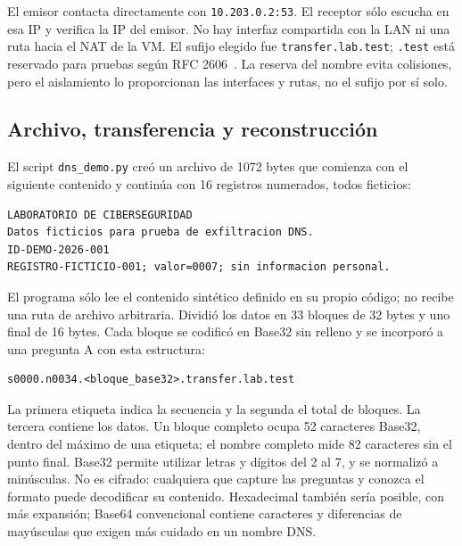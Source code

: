 \documentclass[11pt,a4paper]{article}
\begin{document}
El emisor contacta directamente con \nolinkurl{10.203.0.2:53}. El receptor sólo
escucha en esa IP y verifica la IP del emisor. No hay interfaz compartida
con la LAN ni una ruta hacia el NAT de la VM. El sufijo elegido fue
\nolinkurl{transfer.lab.test}; \nolinkurl{.test} está reservado para pruebas
según RFC 2606~\cite{rfc2606}. La reserva del nombre evita colisiones, pero
el aislamiento lo proporcionan las interfaces y rutas, no el sufijo por sí solo.

\subsection{Archivo, transferencia y reconstrucción}

El script \nolinkurl{dns_demo.py} creó un archivo de 1072 bytes que comienza
con el siguiente contenido y continúa con 16 registros numerados, todos ficticios:

\par\noindent\begin{minipage}{\linewidth}
\begin{lstlisting}
LABORATORIO DE CIBERSEGURIDAD
Datos ficticios para prueba de exfiltracion DNS.
ID-DEMO-2026-001
REGISTRO-FICTICIO-001; valor=0007; sin informacion personal.
\end{lstlisting}
\end{minipage}\par\medskip

El programa sólo lee el contenido sintético definido en su propio código;
no recibe una ruta de archivo arbitraria. Dividió los datos en 33 bloques
de 32 bytes y uno final de 16 bytes. Cada bloque se codificó en Base32 sin
relleno y se incorporó a una pregunta A con esta estructura:

\par\noindent\begin{minipage}{\linewidth}
\begin{lstlisting}
s0000.n0034.<bloque_base32>.transfer.lab.test
\end{lstlisting}
\end{minipage}\par\medskip

La primera etiqueta indica la secuencia y la segunda el total de bloques.
La tercera contiene los datos. Un bloque completo ocupa 52 caracteres
Base32, dentro del máximo de una etiqueta; el nombre completo mide 82
caracteres sin el punto final. Base32 permite utilizar letras y dígitos
del 2 al 7, y se normalizó a minúsculas. No es cifrado: cualquiera que
capture las preguntas y conozca el formato puede decodificar su contenido.
Hexadecimal también sería posible, con más expansión; Base64 convencional
contiene caracteres y diferencias de mayúsculas que exigen más cuidado en
un nombre DNS.
\end{document}

